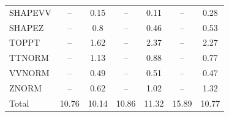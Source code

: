 \begin{table}[H]
\begin{center}
\begin{footnotesize}
\begin{tabular}{lcccccc}
				SHAPEVV & -- &  0.15 & -- &  0.11 & -- &  0.28 \\
				SHAPEZ & -- &  0.8 & -- &  0.46 & -- &  0.53 \\
				TOPPT & -- &  1.62 & -- &  2.37 & -- &  2.27 \\
				TTNORM & -- &  1.13 & -- &  0.88 & -- &  0.77 \\
				VVNORM & -- &  0.49 & -- &  0.51 & -- &  0.47 \\
				ZNORM & -- &  0.62 & -- &  1.02 & -- &  1.32 \\
				Total &  10.76  &  10.14 &  10.86  &  11.32 &  15.89  &  10.77 \\ \hline \hline
			\end{tabular}
			\label{tab:SysUncertainties_1100}
        \end{footnotesize}
	\end{center}
\end{table}



